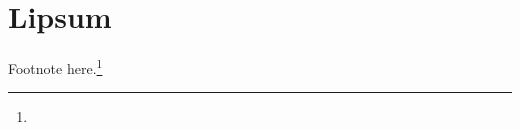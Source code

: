 \documentclass[semcabeco,trimframe,compontinhos,showtrims,12pt,spreadimages]{memoir}
\begin{document}
\chapter{Lipsum}

\lipsum[1] Footnote here.\footnote{\lipsum[3]}%
% 

\asterisc

\lipsum[4]
\end{document}
